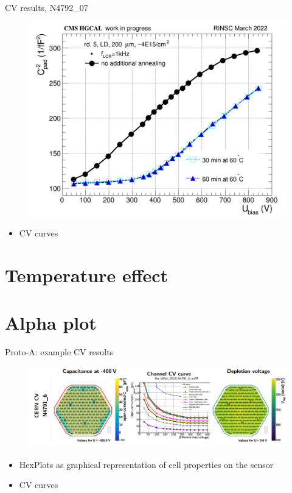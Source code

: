 \documentclass{beamer}
\begin{document}
\begin{frame}{CV results, N4792\_07}
  \begin{figure}
      \includegraphics[width=.7\textwidth]{plots/annealing_CV_ch101_N4792_7.png}    
  \end{figure}
  \begin{itemize}
    \item CV curves
  \end{itemize}
\end{frame}



\section{Temperature effect}


\section{Alpha plot}

\begin{frame}{Proto-A: example CV results}
  \begin{figure}
      \includegraphics[width=1.0\textwidth]{plots/CV_example.png}    
  \end{figure}
  \begin{itemize}
    \item HexPlots as graphical representation of cell properties on the sensor
    \item CV curves
  \end{itemize}
\end{frame}
\end{document}
